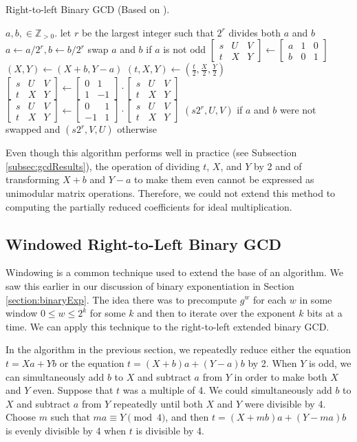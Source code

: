 \documentclass{ucalgthes1}
\theoremstyle{definition}
\newcommand{\ZZgtz}{\mathbb{Z}_{>0}}
\newcommand{\matrixtt}[4]{\left[ \begin{array}{rr} #1 & #2 \\ #3 & #4 \end{array} \right]}
\newcommand{\matrixThreeTwo}[6]{\left[ \begin{array}{rrr} #1 & #2 & #3 \\ #4 & #5 & #6 \end{array} \right]}
\begin{document}
\begin{algorithm}[h]
\caption{Right-to-left Binary GCD (Based on \cite{Stein1967}).}
\label{alg:r2lBinGcd}
\begin{algorithmic}[1]
\REQUIRE $a,b, \in \ZZgtz$.
\STATE let $r$ be the largest integer such that $2^r$ divides both $a$ and $b$
\STATE $a \gets a / 2^r, b \gets b / 2^r$
\STATE swap $a$ and $b$ if $a$ is not odd
\STATE $\matrixThreeTwo{s}{U}{V}{t}{X}{Y} \gets \matrixThreeTwo{a}{1}{0}{b}{0}{1}$
			\STATE $(X, Y) \gets (X+b, Y-a)$
		\ENDIF
		\STATE $(t, X, Y) \gets \left( \frac{t}{2}, \frac{X}{2}, \frac{Y}{2} \right)$
	\ENDWHILE
		\STATE $\matrixThreeTwo{s}{U}{V}{t}{X}{Y} \gets \matrixtt{0}{1}{1}{-1} \cdot \matrixThreeTwo{s}{U}{V}{t}{X}{Y}$
	\ELSE
		\STATE $\matrixThreeTwo{s}{U}{V}{t}{X}{Y} \gets \matrixtt{0}{1}{-1}{1} \cdot \matrixThreeTwo{s}{U}{V}{t}{X}{Y}$
	\ENDIF
\ENDWHILE
\RETURN $(s2^r, U, V)$ if $a$ and $b$ were not swapped and $(s2^r, V, U)$ otherwise
\end{algorithmic}
\end{algorithm}

Even though this algorithm performs well in practice (see Subsection \ref{subsec:gcdResults}), the operation of dividing $t$, $X$, and $Y$ by 2 and of transforming $X+b$ and $Y-a$ to make them even cannot be expressed as unimodular matrix operations.  Therefore, we could not extend this method to computing the partially reduced coefficients for ideal multiplication.

\subsection{Windowed Right-to-Left Binary GCD}

Windowing is a common technique used to extend the base of an algorithm.  We saw this earlier in our discussion of binary exponentiation in Section \ref{section:binaryExp}.  The idea there was to precompute $g^w$ for each $w$ in some window $0 \le w \le 2^k$ for some $k$ and then to iterate over the exponent $k$ bits at a time.  We can apply this technique to the right-to-left extended binary GCD.

In the algorithm in the previous section, we repeatedly reduce either the equation $t=Xa+Yb$ or the equation $t=(X+b)a+(Y-a)b$ by 2. When $Y$ is odd, we can simultaneously add $b$ to $X$ and subtract $a$ from $Y$ in order to make both $X$ and $Y$ even.  Suppose that $t$ was a multiple of 4.  We could simultaneously add $b$ to $X$ and subtract $a$ from $Y$ repeatedly until both $X$ and $Y$ were divisible by 4.  Choose $m$ such that $ma \equiv Y \pmod 4$, and then $t = (X+mb)a + (Y-ma)b$ is evenly divisible by 4 when $t$ is divisible by 4.
\end{document}
